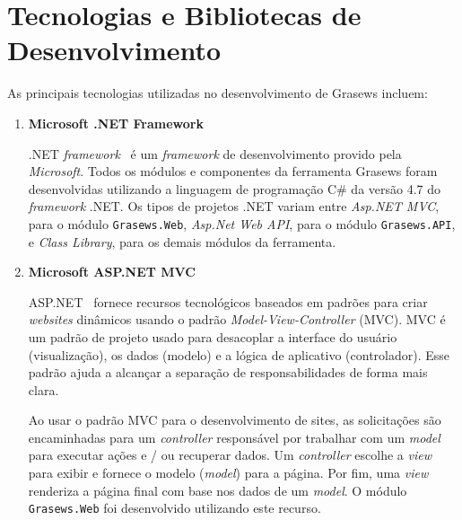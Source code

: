 \chapter{Tecnologias e Bibliotecas de Desenvolvimento}\label{apendice-tecnologias-grasews}

As principais tecnologias utilizadas no desenvolvimento de Grasews incluem:

\begin{enumerate}

  \item \textbf{Microsoft .NET Framework}
  
  .NET \textit{framework}~\cite{MICROSOFT-2019-NET-FRAMEWORK} é um \textit{framework} de desenvolvimento provido pela \textit{Microsoft}. Todos os módulos e componentes da ferramenta Grasews foram desenvolvidas utilizando a linguagem de programação C\# da versão 4.7 do \textit{framework} .NET. Os tipos de projetos .NET variam entre \textit{Asp.NET MVC}, para o módulo \texttt{Grasews.Web}, \textit{Asp.Net Web API}, para o módulo \texttt{Grasews.API}, e \textit{Class Library}, para os demais módulos da ferramenta.
  
  
  \item \textbf{Microsoft ASP.NET MVC}
  
  ASP.NET~\cite{MICROSOFT-2019-ASP-NET-MVC} fornece recursos tecnológicos baseados em padrões para criar \textit{websites} dinâmicos usando o padrão \textit{Model-View-Controller} (MVC). MVC é um padrão de projeto usado para desacoplar a interface do usuário (visualização), os dados (modelo) e a lógica de aplicativo (controlador). Esse padrão ajuda a alcançar a separação de responsabilidades de forma mais clara.
  
  Ao usar o padrão MVC para o desenvolvimento de sites, as solicitações são encaminhadas para um \textit{controller} responsável por trabalhar com um \textit{model} para executar ações e / ou recuperar dados. Um \textit{controller} escolhe a \textit{view} para exibir e fornece o modelo (\textit{model}) para a página. Por fim, uma \textit{view} renderiza a página final com base nos dados de um \textit{model}. O módulo \texttt{Grasews.Web} foi desenvolvido utilizando este recurso.
  
  

\end{enumerate}
